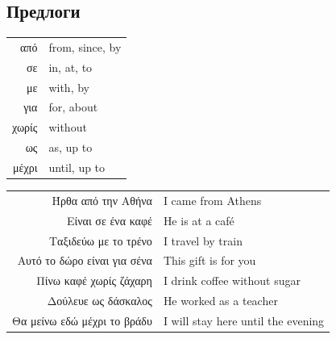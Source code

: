 \documentclass[12pt]{article}
\newcommand{\my}[1]{\textcolor{gray!80!white}{#1}}
\newenvironment{page}{\clearpage\normalsize\null\vfill}{\vfill\null}
\begin{document}
    \begin{page}
        \subsection{Предлоги}
        \begin{tabular}{rl}
            από & \my{from, since, by}\\
            σε & \my{in, at, to}\\
            με & \my{with, by}\\
            για & \my{for, about}\\
            χωρίς & \my{without}\\
            ως & \my{as, up to}\\
            μέχρι & \my{until, up to}\\
        \end{tabular}
        \vfill
        \scriptsize
        \begin{tabular}{rl}
            Ήρθα από την Αθήνα & \my{I came from Athens}\\
            Είναι σε ένα καφέ & \my{He is at a café}\\
            Ταξιδεύω με το τρένο & \my{I travel by train}\\
            Αυτό το δώρο είναι για σένα & \my{This gift is for you}\\
            Πίνω καφέ χωρίς ζάχαρη & \my{I drink coffee without sugar}\\
            Δούλευε ως δάσκαλος & \my{He worked as a teacher}\\
            Θα μείνω εδώ μέχρι το βράδυ & \my{I will stay here until the evening}
        \end{tabular}
    \end{page}
\end{document}
